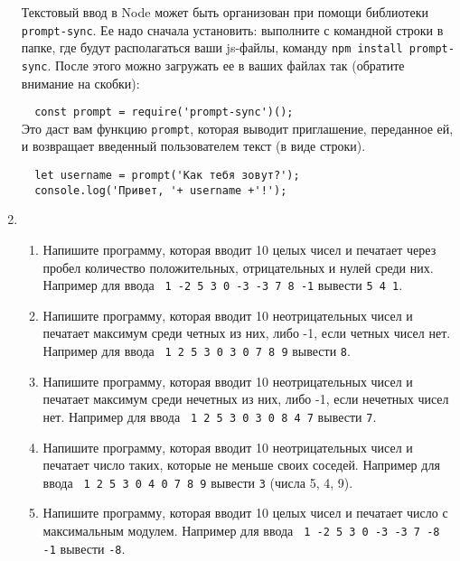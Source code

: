 \documentclass{article}
\begin{document}
\begin{enumerate}[label={}, leftmargin=0pt, itemindent=0pt]
Текстовый ввод в Node может быть организован при помощи библиотеки \texttt{prompt-sync}. Ее надо сначала установить: выполните с командной строки в папке, где будут располагаться ваши js-файлы, команду \texttt{npm install prompt-sync}. После этого можно загружать ее в ваших файлах так (обратите внимание на скобки):

\verb!  const prompt = require('prompt-sync')(); !\\

Это даст вам функцию \texttt{prompt}, которая выводит приглашение, переданное ей, и возвращает введенный пользователем текст (в виде строки).

\verb#  let username = prompt('Как тебя зовут?');#\\
\verb#  console.log('Привет, '+ username +'!');#\\
\item
\begin{enumerate}[label=\arabic{enumi}.\arabic*.]
\item
Напишите программу, которая вводит 10 целых чисел и печатает через пробел количество положительных, отрицательных и нулей среди них. Например для ввода \texttt{ 1 -2 5 3 0 -3 -3 7 8 -1} вывести \texttt{5 4 1}.
\item
Напишите программу, которая вводит 10 неотрицательных чисел и печатает максимум среди четных из них, либо -1, если четных чисел нет. Например для ввода \texttt{ 1 2 5 3 0 3 0 7 8 9} вывести \texttt{8}.
\item
Напишите программу, которая вводит 10 неотрицательных чисел и печатает максимум среди нечетных из них, либо -1, если нечетных чисел нет. Например для ввода \texttt{ 1 2 5 3 0 3 0 8 4 7} вывести \texttt{7}.
\item
Напишите программу, которая вводит 10 неотрицательных чисел и печатает число таких, которые не меньше своих соседей. Например для ввода \texttt{ 1 2 5 3 0 4 0 7 8 9} вывести \texttt{3} (числа 5, 4, 9).
\item
Напишите программу, которая вводит 10 целых чисел и печатает число с максимальным модулем. Например для ввода \texttt{ 1 -2 5 3 0 -3 -3 7 -8 -1} вывести \texttt{-8}.
\end{enumerate}


\end{enumerate}
\end{document}
